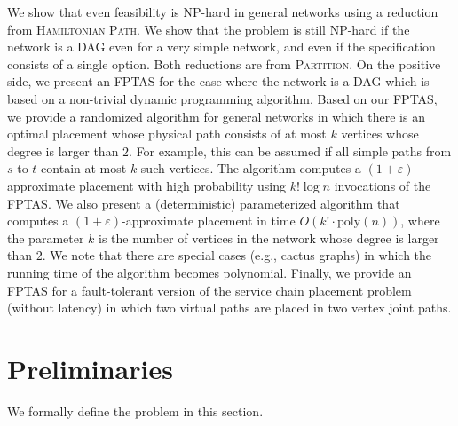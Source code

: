 \documentclass[11pt]{article}
\newcommand{\eps}{\varepsilon}
\begin{document}
We show that even feasibility is NP-hard in general networks using a
reduction from \textsc{Hamiltonian Path}.
We show that the problem is still NP-hard if the network is a DAG even
for a very simple network, and even if the specification consists of a
single option.  Both reductions are from \textsc{Partition}.
%
On the positive side, we present an FPTAS for the case where the
network is a DAG which is based on a non-trivial dynamic programming
algorithm.
%
Based on our FPTAS, we provide a randomized algorithm for general
networks in which there is an optimal placement whose physical path
consists of at most $k$ vertices whose degree is larger than $2$.  For
example, this can be assumed if all simple paths from $s$ to $t$
contain at most $k$ such vertices.  The algorithm computes a
$(1+\eps)$-approximate placement with high probability using $k! \log
n$ invocations of the FPTAS.
%
We also present a (deterministic) parameterized algorithm that
computes a $(1+\eps)$-approximate placement in time $O(k! \cdot
\text{poly}(n))$, where the parameter $k$ is the number of vertices in
the network whose degree is larger than $2$.
%
We note that there are special cases (e.g., cactus graphs) in which
the running time of the algorithm becomes polynomial.
%
Finally, we provide an FPTAS for a fault-tolerant version of the
service chain placement problem (without latency) in which two
virtual paths are placed in two vertex joint paths.


\section{Preliminaries}

We formally define the problem in this section.

\end{document}
